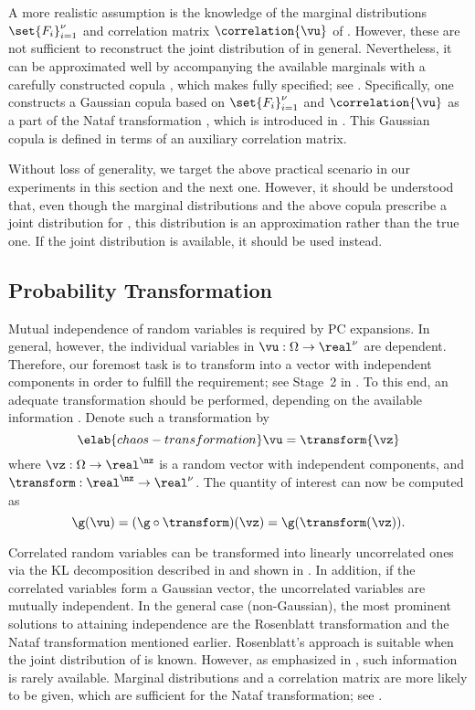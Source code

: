 A more realistic assumption is the knowledge of the marginal distributions
$\set{F_i}_{i = 1}^\nu$ and correlation matrix $\correlation{\vu}$ of \vu.
However, these are not sufficient to reconstruct the joint distribution of \vu
in general. Nevertheless, it can be approximated well by accompanying the
available marginals with a carefully constructed copula \cite{nelsen2006}, which
makes \vu fully specified; see . Specifically, one
constructs a Gaussian copula based on $\set{F_i}_{i = 1}^\nu$ and
$\correlation{\vu}$ as a part of the Nataf transformation \cite{liu1986}, which
is introduced in . This Gaussian copula is
defined in terms of an auxiliary correlation matrix.

Without loss of generality, we target the above practical scenario in our
experiments in this section and the next one. However, it should be understood
that, even though the marginal distributions and the above copula prescribe a
joint distribution for \vu, this distribution is an approximation rather than
the true one. If the joint distribution is available, it should be used instead.

\subsection{Probability Transformation}

Mutual independence of random variables is required by \ac{PC} expansions. In
general, however, the individual variables in $\vu: \Omega \to \real^\nu$ are
dependent. Therefore, our foremost task is to transform \vu into a vector with
independent components in order to fulfill the requirement; see Stage~2 in
. To this end, an adequate transformation should be
performed, depending on the available information \cite{eldred2008}. Denote such
a transformation by
\begin{equation} \elab{chaos-transformation}
  \vu = \transform{\vz}
\end{equation}
where $\vz: \Omega \to \real^\nz$ is a random vector with \nz independent
components, and $\transform: \real^\nz \to \real^\nu$. The quantity of interest
\g can now be computed as
\[
  \g(\vu) = (\g \circ \transform)(\vz) = \g(\transform(\vz)).
\]

Correlated random variables can be transformed into linearly uncorrelated ones
via the \ac{KL} decomposition described in  and
shown in . In addition, if the correlated variables form a
Gaussian vector, the uncorrelated variables are mutually independent. In the
general case (non-Gaussian), the most prominent solutions to attaining
independence are the Rosenblatt transformation \cite{rosenblatt1952} and the
Nataf transformation mentioned earlier. Rosenblatt's approach is suitable when
the joint distribution of \vu is known. However, as emphasized in
, such information is rarely available. Marginal
distributions and a correlation matrix are more likely to be given, which are
sufficient for the Nataf transformation; see .

